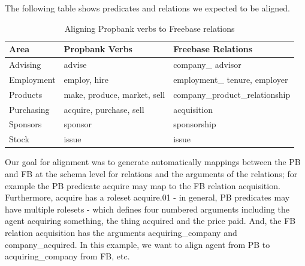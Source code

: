 The following table shows predicates and relations we expected to be aligned.

\begin{table} [ht]
\begin{center}
\small{
\begin{tabular}{p{3cm}p{4cm}p{4.5cm}}
\noalign{\smallskip}
\hline
Area & Propbank Verbs & Freebase Relations\\	
\hline
Advising & advise & company\_ advisor \\
Employment & employ, hire & employment\_ tenure, employer\\
Products & make, produce, market, sell & company\_product\_relationship\\
Purchasing	& acquire, purchase, sell	& acquisition\\
Sponsors	&sponsor	&sponsorship\\
Stock	&issue&	issue\\
\hline
\end{tabular}
}
\caption{Aligning Propbank verbs to Freebase relations}
\vspace{-0.4cm}
\end{center}
\end{table}

Our goal for alignment was to generate automatically mappings between the PB and FB at the schema level for relations and the arguments of the relations; for example the PB predicate acquire may map to the FB relation acquisition.
Furthermore, acquire has a roleset acquire.01 - in general, PB predicates may have multiple rolesets - which defines four numbered arguments including the agent acquiring something, the thing acquired and the price paid.
And, the FB relation acquisition has the arguments acquiring\_company and company\_acquired.
In this example, we want to align agent from PB to acquiring\_company from FB, etc. 

